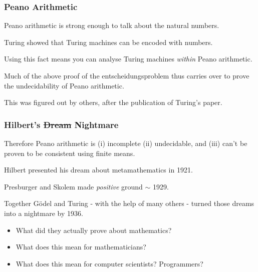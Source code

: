\documentclass{beamer}
\begin{document}
\begin{frame}
	\frametitle{Peano Arithmetic}

	Peano arithmetic is strong enough to talk about the natural numbers. 

	\vspace{0.3cm}

	Turing showed that Turing machines can be encoded with numbers. 

	\vspace{0.3cm}

	Using this fact means you can analyse Turing machines \emph{within} Peano arithmetic. 
	
	\vspace{0.3cm}
	
	Much of the above proof of the entscheidungsproblem thus carries over to prove the undecidability of Peano arithmetic. 

	\vspace{0.3cm}

	This was figured out by others, after the publication of Turing's paper.

	\vspace{0.3cm}


\end{frame}

\begin{frame}
	\frametitle{Hilbert's \st{Dream} Nightmare}

	Therefore Peano arithmetic is (i) incomplete (ii) undecidable, and (iii) can't be proven to be consistent using finite means. 

	\vspace{0.3cm}

	Hilbert presented his dream about metamathematics in 1921. 

	\vspace{0.5cm}

	Presburger and Skolem made \emph{positive} ground $\sim$ 1929.

	\vspace{0.3cm}
	
	Together G\"{o}del and Turing - with the help of many others - turned those dreams into a nightmare by 1936.

	\vspace{0.5cm}

	\begin{itemize}
		\item[] What did they actually prove about mathematics? 
		\item[] What does this mean for mathematicians?
		\item[] What does this mean for computer scientists? Programmers?
	\end{itemize}
	

\end{frame}
\end{document}
